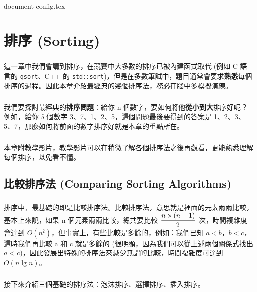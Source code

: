 \documentclass[12pt,a4paper,oneside]{report}
\begin{document}
\begin{CJK}{UTF8}{bkai}

{document-config.tex}
\setcounter{chapter}{2}

\fi

\chapter{排序 (Sorting)}

\paragraph{}這一章中我們會講到排序，在競賽中大多數的排序已被內建函式取代 (例如 C 語言的 \lstinline{qsort}{}、C++ 的 \lstinline{std::sort}{})，但是在多數筆試中，題目通常會要求\textbf{熟悉}每個排序的過程。因此本章介紹最經典的幾個排序法，務必在腦中多模擬演練。

\paragraph{}我們要探討最經典的\textbf{排序問題}：給你 n 個數字，要如何將他\textbf{從小到大}排序好呢？例如，給你 5 個數字 3、7、1、2、5，這個問題最後要得到的答案是 1、2、3、5、7，那麼如何將前面的數字排序好就是本章的重點所在。

\paragraph{}本章附教學影片，教學影片可以在稍微了解各個排序法之後再觀看，更能熟悉理解每個排序，以免看不懂。

\section{比較排序法 (Comparing Sorting Algorithms)}

\paragraph{}排序中，最基礎的即是比較排序法。比較排序法，意思就是裡面的元素兩兩比較，基本上來說，如果 n 個元素兩兩比較，總共要比較 $\displaystyle{{n\times{(n - 1)}}\over{2}}$ 次，時間複雜度會達到 $O(n^2)$，但事實上，有些比較是多餘的，例如：我們已知 $a<b$，$b<c$，這時我們再比較 a 和 c 就是多餘的 (很明顯，因為我們可以從上述兩個關係式找出 $a<c$)，因此發展出特殊的排序法來減少無謂的比較，時間複雜度可達到 $O(n\lg{n})$。

\paragraph{}接下來介紹三個基礎的排序法：泡沫排序、選擇排序、插入排序。


\end{CJK}
\end{document}
